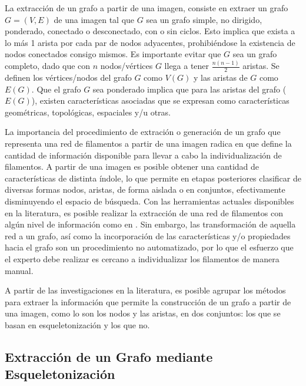 La extracci\'on de un grafo a partir de una imagen, consiste en extraer un grafo $G = (V,E)$ de una imagen tal que $G$ sea un grafo simple, no dirigido, ponderado, conectado o desconectado, con o sin ciclos. Esto implica que exista a lo m\'as 1 arista por cada par de nodos adyacentes, prohibi\'endose la existencia de nodos conectados consigo mismos. Es importante evitar que $G$ sea un grafo completo, dado que con $n$ nodos/v\'ertices $G$ llega a tener $\frac{n(n-1)}{2}$ aristas.
Se definen los v\'ertices/nodos del grafo $G$ como $V(G)$ y las aristas de $G$ como $E(G)$. 
Que el grafo $G$ sea ponderado implica que para las aristas del grafo ($E(G)$), existen caracter\'isticas asociadas que se expresan como caracter\'isticas geom\'etricas, topol\'ogicas, espaciales y/u otras.


La importancia del procedimiento de extraci\'on o generaci\'on de un grafo que representa una red de filamentos a partir de una imagen radica en que define la cantidad de informaci\'on disponible para llevar a cabo la individualizaci\'on de filamentos. A partir de una imagen es posible obtener una cantidad de caracter\'isticas de distinta \'indole, lo que permite en etapas posteriores clasificar de diversas formas nodos, aristas, de forma aislada o en conjuntos, efectivamente disminuyendo el espacio de b\'usqueda. Con las herramientas actuales disponibles en la literatura, es posible realizar la extracci\'on de una red de filamentos con algún nivel de informaci\'on como en \cite{xu2015soax}. Sin embargo, las transformaci\'on de aquella red a un grafo, as\'i como la incorporaci\'on de las caracter\'isticas y/o propiedades hacia el grafo son un procedimiento no automatizado, por lo que el esfuerzo que el experto debe realizar es cercano a individualizar los filamentos de manera manual.

A partir de las investigaciones en la literatura, es posible agrupar los m\'etodos para extraer la informaci\'on que permite la construcci\'on de un grafo a partir de una imagen, como lo son los nodos y las aristas, en dos conjuntos: los que se basan en esqueletonizaci\'on \cite{lavado2018comparacion} y los que no. 

\subsection{Extracci\'on de un Grafo mediante Esqueletonizaci\'on}
\label{subsec:infoLossSkel}

